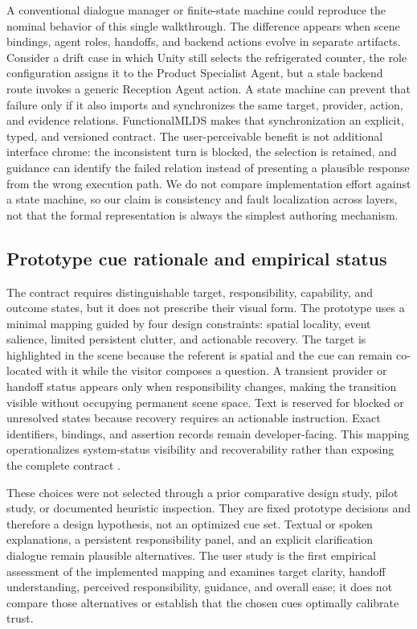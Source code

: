 A conventional dialogue manager or finite-state machine could reproduce the
nominal behavior of this single walkthrough.  The difference appears when
scene bindings, agent roles, handoffs, and backend actions evolve in separate
artifacts.  Consider a drift case in which Unity still selects the refrigerated
counter, the role configuration assigns it to the Product Specialist Agent,
but a stale backend route invokes a generic Reception Agent action.  A state
machine can prevent that failure only if it also imports and synchronizes the
same target, provider, action, and evidence relations.  FunctionalMLDS makes
that synchronization an explicit, typed, and versioned contract.  The
user-perceivable benefit is not additional interface chrome: the inconsistent
turn is blocked, the selection is retained, and guidance can identify the
failed relation instead of presenting a plausible response from the wrong
execution path.  We do not compare implementation effort against a state
machine, so our claim is consistency and fault localization across layers, not
that the formal representation is always the simplest authoring mechanism.

\subsection{Prototype cue rationale and empirical status}

The contract requires distinguishable target, responsibility, capability, and
outcome states, but it does not prescribe their visual form.  The prototype
uses a minimal mapping guided by four design constraints: spatial locality,
event salience, limited persistent clutter, and actionable recovery.  The
target is highlighted in the scene because the referent is spatial and the cue
can remain co-located with it while the visitor composes a question.  A
transient provider or handoff status appears only when responsibility changes,
making the transition visible without occupying permanent scene space.  Text
is reserved for blocked or unresolved states because recovery requires an
actionable instruction.  Exact identifiers, bindings, and assertion records
remain developer-facing.  This mapping operationalizes system-status visibility
and recoverability rather than exposing the complete contract
\cite{amershi2019guidelines}.

These choices were not selected through a prior comparative design study,
pilot study, or documented heuristic inspection.  They are fixed prototype
decisions and therefore a design hypothesis, not an optimized cue set.
Textual or spoken explanations, a persistent responsibility panel, and an
explicit clarification dialogue remain plausible alternatives.  The user
study is the first empirical assessment of the implemented mapping and examines
target clarity, handoff understanding, perceived responsibility, guidance, and
overall ease; it does not compare those alternatives or establish that the
chosen cues optimally calibrate trust.

